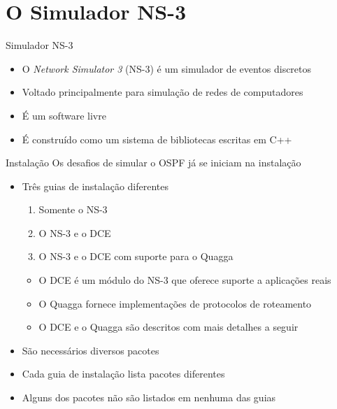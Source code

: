 \documentclass{beamer}
\newlength{\wideitemsep}
\let\olditem\item
\renewcommand{\item}{\setlength{\itemsep}{\wideitemsep}\olditem}
\begin{document}
\section{O Simulador NS-3} %
\begin{frame}{Simulador NS-3}
\begin{itemize}
 \item O \textit{Network Simulator 3} (NS-3) é um simulador de eventos discretos %
 \item Voltado principalmente para simulação de redes de computadores %
 \item É um software livre %
 \item É construído como um sistema de bibliotecas escritas em C++ %
\end{itemize}
\end{frame}

\begin{frame}{Instalação}
Os desafios de simular o OSPF já se iniciam na instalação
\begin{itemize}
 \item Três guias de instalação diferentes %
  \begin{enumerate}
   \olditem Somente o NS-3 %
   \olditem O NS-3 e o DCE %
   \olditem O NS-3 e o DCE com suporte para o Quagga %
  \end{enumerate}
  \begin{itemize}
   \olditem O DCE é um módulo do NS-3 que oferece suporte a aplicações reais %
   \olditem O Quagga fornece implementações de protocolos de roteamento %
   \olditem O DCE e o Quagga são descritos com mais detalhes a seguir %
  \end{itemize}
 \item São necessários diversos pacotes %
 \item Cada guia de instalação lista pacotes diferentes %
 \item Alguns dos pacotes não são listados em nenhuma das guias %
\end{itemize}
\end{frame}

\end{document}
